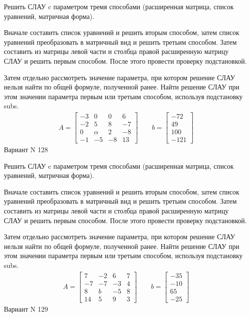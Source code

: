 \documentclass[11pt]{report}
\begin{document}
Решить СЛАУ c параметром тремя способами (расширенная матрица, список уравнений, матричная форма).

Вначале составить список уравнений и решить вторым способом,
затем список уравнений преобразовать в матричный вид и решить третьим способом.
Затем составить из матрицы левой части и столбца правой расширенную матрицу СЛАУ и решить первым способом.
После этого провести проверку подстановкой.

Затем отдельно рассмотреть значение параметра, при котором решение СЛАУ нельзя найти по общей формуле,
полученной ранее.
Найти решение СЛАУ при этом значении параметра первым или третьим способом, используя подстановку subs.
\begin{align*}
    A = \left[\begin{matrix}-3 & 0 & 0 & 6\\-2 & 5 & 8 & -7\\0 & \alpha & 2 & -8\\-1 & -5 & -8 & 13\end{matrix}\right]
\qquad b = \left[\begin{matrix}-72\\49\\100\\-121\end{matrix}\right]
\end{align*}
\newpage
Вариант N 128


Решить СЛАУ c параметром тремя способами (расширенная матрица, список уравнений, матричная форма).

Вначале составить список уравнений и решить вторым способом,
затем список уравнений преобразовать в матричный вид и решить третьим способом.
Затем составить из матрицы левой части и столбца правой расширенную матрицу СЛАУ и решить первым способом.
После этого провести проверку подстановкой.

Затем отдельно рассмотреть значение параметра, при котором решение СЛАУ нельзя найти по общей формуле,
полученной ранее.
Найти решение СЛАУ при этом значении параметра первым или третьим способом, используя подстановку subs.
\begin{align*}
    A = \left[\begin{matrix}7 & -2 & 6 & 7\\-7 & -7 & -3 & 4\\8 & b & -5 & 8\\14 & 5 & 9 & 3\end{matrix}\right]
\qquad b = \left[\begin{matrix}-35\\-10\\65\\-25\end{matrix}\right]
\end{align*}
\newpage
Вариант N 129
\end{document}
